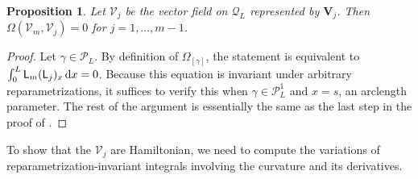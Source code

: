 \documentclass[pdftex]{sigma}
\newcommand\Leg{ {\mathcal P}} %
\newcommand\Legq{\mathcal Q}
\newcommand\uL{\mathsf L} %
\def\vecV{\mathbf V}
\newcommand\qV{\mathcal V}%
\def\gam{\gamma} %
\numberwithin{equation}{section}
\newtheorem{Proposition}[Theorem]{Proposition}
 { \theoremstyle{definition}
\newtheorem{Definition}[Theorem]{Definition}
\newtheorem{Note}[Theorem]{Note}
\newtheorem{Example}[Theorem]{Example}
\newtheorem{Remark}[Theorem]{Remark} }
\begin{document}
\begin{Proposition} Let $\qV_j$ be the vector field on $\Legq_L$ represented by $\vecV_j$. Then $\Omega(\qV_m ,\qV_j) =0$ for $j=1,\ldots, m-1$.
\end{Proposition}
\begin{proof} Let $\gam\in \Leg_L$. By definition of $\Omega_{[\gamma]}$, the statement is equivalent to $\int_0^L \uL_m (\uL_j)_x \,{\rm d}x=0$.
Because this equation is invariant under arbitrary reparametrizations, it
suffices to verify this when $\gam\in \Leg^1_L$ and $x=s$, an arclength parameter. The rest of the argument is essentially
the same as the last step in the proof of \cite[Lemma~7.25]{OlverLieGroups}.
\end{proof}

To show that the $\qV_j$ are Hamiltonian, we need to compute the variations of reparametrization-invariant integrals involving the curvature and its derivatives.
\end{document}
